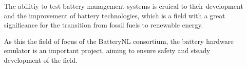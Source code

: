 \IEEEPARstart
{T}{he} abilitiy to test battery management systems is cruical 
to their development and the improvement of battery technologies,
which is a field with a great significance for the transition
from fossil fuels to renewable energy. 

As this the field of focus of the BatteryNL consortium, the
battery hardware emulator is an important project, aiming to 
ensure safety and steady development of the field. 